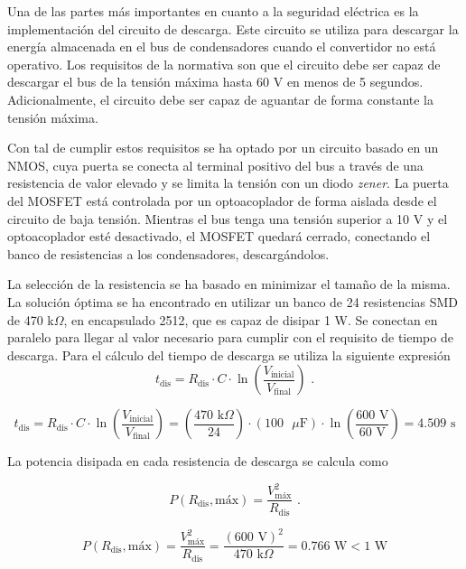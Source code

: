 Una de las partes más importantes en cuanto a la seguridad eléctrica es la implementación del circuito de descarga. Este circuito se utiliza para descargar la energía almacenada en el bus de condensadores cuando el convertidor no está operativo. Los requisitos de la normativa son que el circuito debe ser capaz de descargar el bus de la tensión máxima hasta 60 V en menos de 5 segundos. Adicionalmente, el circuito debe ser capaz de aguantar de forma constante la tensión máxima.

Con tal de cumplir estos requisitos se ha optado por un circuito basado en un NMOS, cuya puerta se conecta al terminal positivo del bus a través de una resistencia de valor elevado y se limita la tensión con un diodo \textit{zener}. La puerta del MOSFET está controlada por un optoacoplador de forma aislada desde el circuito de baja tensión. Mientras el bus tenga una tensión superior a 10 V y el optoacoplador esté desactivado, el MOSFET quedará cerrado, conectando el banco de resistencias a los condensadores, descargándolos.

La selección de la resistencia se ha basado en minimizar el tamaño de la misma. La solución óptima se ha encontrado en utilizar un banco de 24 resistencias SMD de 470 k$\Omega$, en encapsulado 2512, que es capaz de disipar 1 W. Se conectan en paralelo para llegar al valor necesario para cumplir con el requisito de tiempo de descarga. Para el cálculo del tiempo de descarga se utiliza la siguiente expresión
\begin{equation}
	t_{\text{dis}} = R_{\text{dis}} \cdot C \cdot \ln\left(\frac{V_{\text{inicial}}}{V_{\text{final}}}\right)\text{ .}
\end{equation}

\[
t_{\text{dis}} = R_{\text{dis}} \cdot C \cdot \ln\left(\frac{V_{\text{inicial}}}{V_{\text{final}}}\right) = \left(\frac{470 \text{ k}\Omega}{24}\right) \cdot (100\text{ }\mu\text{F}) \cdot \ln\left(\frac{600 \text{ V}}{60 \text{ V}}\right) = 4.509 \text{ s}
\] 

La potencia disipada en cada resistencia de descarga se calcula como

\begin{equation}
	P(R_{\text{dis}}, \text{máx}) = \frac{V_{\text{máx}}^2}{R_{\text{dis}}} \text{ .}
\end{equation}

\[
P(R_{\text{dis}}, \text{máx}) = \frac{V_{\text{máx}}^2}{R_{\text{dis}}} = \frac{(600\text{ V})^2}{470 \text{ k}\Omega} = 0.766 \text{ W} < 1 \text{ W}
\]

